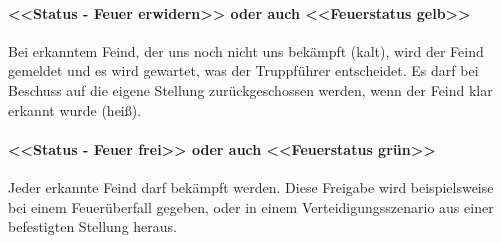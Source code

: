 \paragraph{<<Status - Feuer erwidern>>  oder auch <<Feuerstatus gelb>> }

	Bei erkanntem Feind, der uns noch nicht uns bekämpft (kalt), wird der Feind gemeldet und es wird gewartet, was der Truppführer entscheidet. Es darf bei Beschuss auf die eigene Stellung zurückgeschossen werden, wenn der Feind klar erkannt wurde (heiß). \\

\paragraph{<<Status - Feuer frei>> oder auch <<Feuerstatus grün>> }

	Jeder erkannte Feind darf bekämpft werden. Diese Freigabe wird beispielsweise bei einem Feuerüberfall gegeben, oder in einem Verteidigungsszenario aus einer befestigten Stellung heraus. \\

